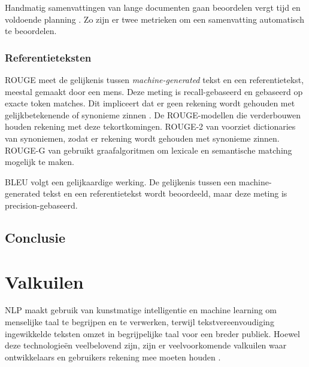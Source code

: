 
Handmatig samenvattingen van lange documenten gaan beoordelen vergt tijd en voldoende planning \autocite{Nenkova2004}. Zo zijn er twee metrieken om een samenvatting automatisch te beoordelen.


\subsubsection{Referentieteksten}

ROUGE meet de gelijkenis tussen \textit{machine-generated} tekst en een referentietekst, meestal gemaakt door een mens. Deze meting is recall-gebaseerd en gebaseerd op exacte token matches. Dit impliceert dat er geen rekening wordt gehouden met gelijkbetekenende of synonieme zinnen \autocite{Lin2004}. De ROUGE-modellen die verderbouwen houden rekening met deze tekortkomingen. ROUGE-2 van \textcite{Ganesan2018} voorziet dictionaries van synoniemen, zodat er rekening wordt gehouden met synonieme zinnen. ROUGE-G van \textcite{ShafieiBavani2018} gebruikt graafalgoritmen om lexicale en semantische matching mogelijk te maken.

BLEU volgt een gelijkaardige werking. De gelijkenis tussen een machine-generated tekst en een referentietekst wordt beoordeeld, maar deze meting is precision-gebaseerd.




\subsection{Conclusie}


\section{Valkuilen}

NLP maakt gebruik van kunstmatige intelligentie en machine learning om menselijke taal te begrijpen en te verwerken, terwijl tekstvereenvoudiging ingewikkelde teksten omzet in begrijpelijke taal voor een breder publiek. Hoewel deze technologieën veelbelovend zijn, zijn er veelvoorkomende valkuilen waar ontwikkelaars en gebruikers rekening mee moeten houden \autocite{Sciforce2020, Roldos2020, Khurana2022}.

